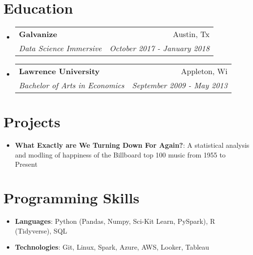 \documentclass[letterpaper,11pt]{article}
\makeatletter
\newcommand{\resumeItem}[2]{
  \item\small{
    \textbf{#1}{: #2 \vspace{-2pt}}
  }
}
\newcommand{\resumeSubheading}[4]{
  \vspace{-1pt}\item
    \begin{tabular*}{0.97\textwidth}[t]{l@{\extracolsep{\fill}}r}
      \textbf{#1} & #2 \\
      \textit{\small#3} & \textit{\small #4} \\
    \end{tabular*}\vspace{-5pt}
}
\newcommand{\resumeSubItem}[2]{\resumeItem{#1}{#2}\vspace{-4pt}}
\newcommand{\resumeSubHeadingListStart}{\begin{itemize}[leftmargin=*]}
\newcommand{\resumeSubHeadingListEnd}{\end{itemize}}
\makeatother
\begin{document}
\section{Education}
  \resumeSubHeadingListStart
    \resumeSubheading
      {Galvanize}{Austin, Tx}
      {Data Science Immersive}{October 2017 - January 2018}
    \resumeSubheading
      {Lawrence University}{Appleton, Wi}
      {Bachelor of Arts in Economics}{September 2009 - May 2013}
  \resumeSubHeadingListEnd


\section{Projects}
  \resumeSubHeadingListStart
    \resumeSubItem{What Exactly are We Turning Down For Again?}
      {A statistical analysis and modling of happiness of the Billboard top 100 music from 1955 to Present}
  \resumeSubHeadingListEnd


\section{Programming Skills}
  \resumeSubHeadingListStart
    \item{
      \textbf{Languages}{: Python (Pandas, Numpy, Sci-Kit Learn, PySpark), R (Tidyverse), SQL}
    }
    \item{
      \textbf{Technologies}{: Git, Linux, Spark, Azure, AWS, Looker, Tableau}
    }
  \resumeSubHeadingListEnd


\end{document}
